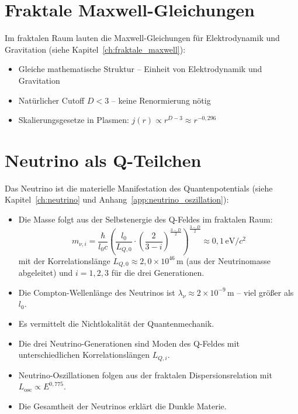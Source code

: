 \section{Fraktale Maxwell-Gleichungen}
\label{sec:fraktale_maxwell_zf}

Im fraktalen Raum lauten die Maxwell-Gleichungen für Elektrodynamik und Gravitation (siehe Kapitel~\ref{ch:fraktale_maxwell}):

\begin{itemize}
    \item Gleiche mathematische Struktur – Einheit von Elektrodynamik und Gravitation
    \item Natürlicher Cutoff \( D < 3 \) – keine Renormierung nötig
    \item Skalierungsgesetze in Plasmen: \( j(r) \propto r^{D-3} \approx r^{-0,296} \)
\end{itemize}

\section{Neutrino als Q-Teilchen}
\label{sec:neutrino_zf}

Das Neutrino ist die materielle Manifestation des Quantenpotentials (siehe Kapitel~\ref{ch:neutrino} und Anhang~\ref{app:neutrino_oszillation}):

\begin{itemize}
    \item Die Masse folgt aus der Selbstenergie des Q-Feldes im fraktalen Raum:
    \[
    m_{\nu,i} = \frac{\hbar}{l_0 c} \left( \frac{l_0}{L_{Q,0}} \cdot \left(\frac{2}{3-i}\right)^{\frac{3-D}{2}} \right)^{\frac{3-D}{2}} \approx 0{,}1 \, \text{eV}/c^2
    \]
    mit der Korrelationslänge \( L_{Q,0} \approx 2{,}0 \times 10^{46} \, \text{m} \) (aus der Neutrinomasse abgeleitet) und \( i = 1,2,3 \) für die drei Generationen.
    
    \item Die Compton-Wellenlänge des Neutrinos ist \( \lambda_\nu \approx 2 \times 10^{-9} \, \text{m} \) – viel größer als \( l_0 \).
    
    \item Es vermittelt die Nichtlokalität der Quantenmechanik.
    
    \item Die drei Neutrino-Generationen sind Moden des Q-Feldes mit unterschiedlichen Korrelationslängen \( L_{Q,i} \).
    
    \item Neutrino-Oszillationen folgen aus der fraktalen Dispersionsrelation mit \( L_{\text{osc}} \propto E^{0,775} \).
    
    \item Die Gesamtheit der Neutrinos erklärt die Dunkle Materie.
\end{itemize}

